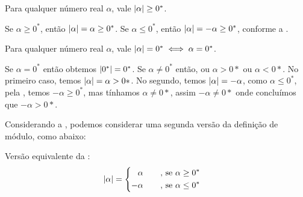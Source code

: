 \documentclass[../main.tex]{subfiles}
\begin{document}
\begin{teo}\label{reais-teo-moduloPositivo}
    Para qualquer número real $\alpha$, vale $\abs{\alpha} \geq 0^*$.
\end{teo}
\begin{dem}
    Se $\alpha \geq 0^*$, então $\abs{\alpha} = \alpha \geq 0^*$. 
    Se $\alpha \leq 0^*$, então $\abs{\alpha} = -\alpha \geq 0^*$, conforme a . 
\end{dem}
\begin{prop}\label{reais-prop-mod00}
    Para qualquer número real $\alpha$, vale $\abs{\alpha} = 0^* \iff \alpha = 0^*$.
\end{prop}
\begin{dem}
    Se $\alpha = 0^*$ então obtemos $\abs{0^*} = 0^*$. 
    Se $\alpha \neq 0^*$ então, ou $\alpha > 0*$ ou $\alpha < 0*$. No primeiro caso, temos $\abs{\alpha} = \alpha > 0*$. No segundo, temos $\abs{\alpha} = -\alpha$, como $\alpha \leq 0^*$, pela , temos $-\alpha \geq 0^*$, mas tínhamos $\alpha \neq 0*$, assim $-\alpha \neq 0*$ onde concluímos que $-\alpha > 0*$.
\end{dem}

\begin{obs}
    Considerando a , podemos considerar uma segunda versão da definição de módulo, como abaixo:
\end{obs}

\begin{defi}\label{reais-def-modulo2}
    Versão equivalente da : 
    \begin{equation*}
        \abs{\alpha} = 
        \begin{cases}
        \begin{aligned}
             &\alpha \hspace{0.6cm} \text{ , se } \alpha \geq 0^* \\
            -&\alpha \hspace{0.6cm} \text{ , se } \alpha \leq 0^*
        \end{aligned}
        \end{cases}            
    \end{equation*}
\end{defi}
\end{document}
